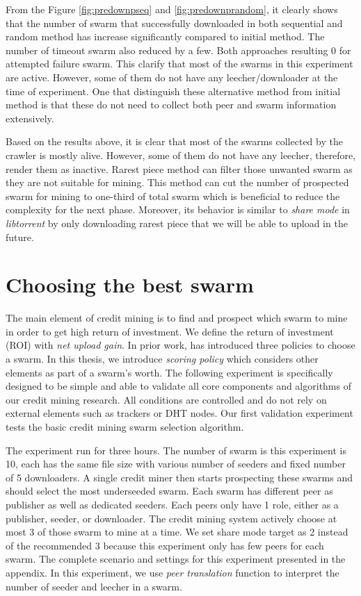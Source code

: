 From the Figure \ref{fig:predownpseq} and \ref{fig:predownprandom}, it clearly shows that the number of swarm that successfully downloaded in both sequential and random method has increase significantly compared to initial method. The number of timeout swarm also reduced by a few. Both approaches resulting 0 for attempted failure swarm. This clarify that most of the swarms in this experiment are active. However, some of them do not have any leecher/downloader at the time of experiment. One that distinguish these alternative method from initial method is that these do not need to collect both peer and swarm information extensively. 

Based on the results above, it is clear that most of the swarms collected by the crawler is mostly alive. However, some of them do not have any leecher, therefore, render them as inactive. Rarest piece method can filter those unwanted swarm as they are not suitable for mining. This method can cut the number of prospected swarm for mining to one-third of total swarm which is beneficial to reduce the complexity for the next phase. Moreover, its behavior is similar to \textit{share mode} in \textit{libtorrent} by only downloading rarest piece that we will be able to upload in the future.

\section{Choosing the best swarm}
\label{section:chooseswarmexp}
The main element of credit mining is to find and prospect which swarm to mine in order to get high return of investment. We define the return of investment (ROI) with \textit{net upload gain}. In prior work, \citeauthor{2015:creditmining:capota} has introduced three policies to choose a swarm. In this thesis, we introduce \textit{scoring policy} which considers other elements as part of a swarm's worth. The following experiment is specifically designed to be simple and able to validate all core components and algorithms of our credit mining research. All conditions are controlled and do not rely on external elements such as trackers or DHT nodes. Our first validation experiment tests the basic credit mining swarm selection algorithm.

The experiment run for three hours. The number of swarm is this experiment is 10, each has the same file size with various number of seeders and fixed number of 5 downloaders. A single credit miner then starts prospecting these swarms and should select the most underseeded swarm. Each swarm has different peer as publisher as well as dedicated seeders. Each peers only have 1 role, either as a publisher, seeder, or downloader. The credit mining system actively choose at most 3 of those swarm to mine at a time. We set share mode target as 2 instead of the recommended 3 because this experiment only has few peers for each swarm. The complete scenario and settings for this experiment presented in the appendix. In this experiment, we use \textit{peer translation} function to interpret the number of seeder and leecher in a swarm.

